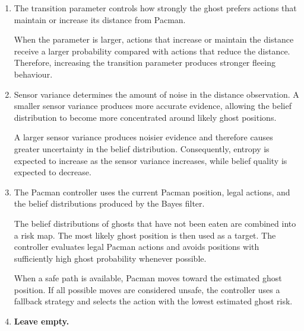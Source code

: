 \documentclass{article}
\begin{document}
\begin{enumerate}[label=\alph*.,leftmargin=*]
    \item
    The transition parameter controls how strongly the ghost prefers actions
    that maintain or increase its distance from Pacman.

    When the parameter is larger, actions that increase or maintain the
    distance receive a larger probability compared with actions that reduce
    the distance. Therefore, increasing the transition parameter produces
    stronger fleeing behaviour.

    \item
    Sensor variance determines the amount of noise in the distance
    observation. A smaller sensor variance produces more accurate evidence,
    allowing the belief distribution to become more concentrated around
    likely ghost positions.

    A larger sensor variance produces noisier evidence and therefore causes
    greater uncertainty in the belief distribution. Consequently, entropy
    is expected to increase as the sensor variance increases, while belief
    quality is expected to decrease.

    \item
    The Pacman controller uses the current Pacman position, legal actions,
    and the belief distributions produced by the Bayes filter.

    The belief distributions of ghosts that have not been eaten are combined
    into a risk map. The most likely ghost position is then used as a target.
    The controller evaluates legal Pacman actions and avoids positions with
    sufficiently high ghost probability whenever possible.

    When a safe path is available, Pacman moves toward the estimated ghost
    position. If all possible moves are considered unsafe, the controller
    uses a fallback strategy and selects the action with the lowest estimated
    ghost risk.

    \item \textbf{Leave empty.}

\end{enumerate}

\end{document}
